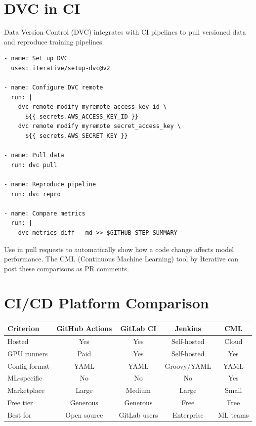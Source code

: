 \section{DVC in CI}
\label{sec:dvc-ci}

Data Version Control (DVC) integrates with CI pipelines to pull
versioned data and reproduce training pipelines.

\begin{codeblock}[title=\textbf{DVC integration in GitHub Actions}]
\begin{verbatim}
- name: Set up DVC
  uses: iterative/setup-dvc@v2

- name: Configure DVC remote
  run: |
    dvc remote modify myremote access_key_id \
      ${{ secrets.AWS_ACCESS_KEY_ID }}
    dvc remote modify myremote secret_access_key \
      ${{ secrets.AWS_SECRET_KEY }}

- name: Pull data
  run: dvc pull

- name: Reproduce pipeline
  run: dvc repro

- name: Compare metrics
  run: |
    dvc metrics diff --md >> $GITHUB_STEP_SUMMARY
\end{verbatim}
\end{codeblock}

\begin{remark}
Use  in pull requests to automatically show how
a code change affects model performance. The CML (Continuous Machine
Learning) tool by Iterative can post these comparisons as PR comments.
\end{remark}

\section{CI/CD Platform Comparison}
\label{sec:cicd-comparison}

\begin{center}
\begin{tabular}{@{}lcccc@{}}
\toprule
\textbf{Criterion} & \textbf{GitHub Actions} & \textbf{GitLab CI} &
  \textbf{Jenkins} & \textbf{CML} \\
\midrule
Hosted & Yes & Yes & Self-hosted & Cloud \\
GPU runners & Paid & Yes & Self-hosted & Yes \\
Config format & YAML & YAML & Groovy/YAML & YAML \\
ML-specific & No & No & No & Yes \\
Marketplace & Large & Medium & Large & Small \\
Free tier & Generous & Generous & Free & Free \\
Best for & Open source & GitLab users & Enterprise & ML teams \\
\bottomrule
\end{tabular}
\end{center}

